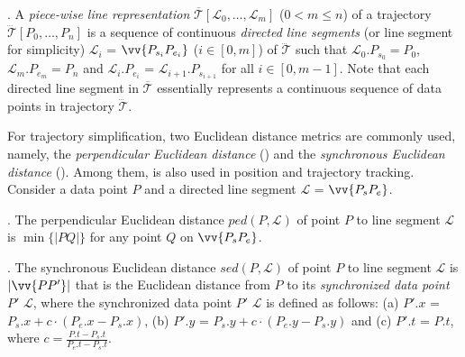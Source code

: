 
. A \textit{piece-wise line representation} $\overline{\mathcal{T}}\left[\mathcal{L}_0, \ldots, \mathcal{L}_m\right]$ ($0< m \le n$) of a trajectory $\dddot{\mathcal{T}}\left[P_0, \ldots, P_n\right]$ is a sequence of continuous \textit{directed line segments} (or line segment for simplicity) $\mathcal{L}_{i}$ = $\vv{P_{s_i}P_{e_i}}$ ($i\in\left[0,m\right]$) of $\dddot{\mathcal{T}}$ such that $\mathcal{L}_{0}.P_{s_0} = P_0$, $\mathcal{L}_{m}.P_{e_m} = P_n$ and  $\mathcal{L}_{i}.P_{e_i}$ = $\mathcal{L}_{i+1}.P_{s_{i+1}}$ for all $i\in\left[0, m-1\right]$.
Note that each directed line segment in $\overline{\mathcal{T}}$ essentially represents a continuous sequence of data points in trajectory $\dddot{\mathcal{T}}$.



For trajectory simplification, two Euclidean distance metrics are commonly used, namely, the \emph{perpendicular Euclidean distance} (\ped) and the \emph{synchronous Euclidean distance} \cite{Meratnia:Spatiotemporal} (\sed). Among them, \sed is also used in position and trajectory tracking.
%
Consider a data point $P$ and a directed line segment $\mathcal{L}$ = $\vv{P_{s}P_{e}}$.

. The perpendicular Euclidean distance $ped\left(P, \mathcal{L}\right)$ of point $P$ to line segment $\mathcal{L}$ is $\min\{|PQ|\}$ for any point $Q$ on $\vv{P_{s}P_{e}}$.

. The synchronous Euclidean distance $sed\left(P, \mathcal{L}\right)$ of point $P$ to line segment $\mathcal{L}$ is $|\vv{PP'}|$ that is the Euclidean distance from $P$ to its \textit{synchronized data point} $P'$ \wrt $\mathcal{L}$, where the synchronized data point $P'$ \wrt $\mathcal{L}$ is defined as follows:
(a) $P'.x$ = $P_s.x +  c\cdot\left(P_e.x - P_s.x\right)$,
(b) $P'.y$ = $P_s.y +  c\cdot\left(P_e.y - P_s.y\right)$ and
(c) $P'.t$ = $P.t$, where $c= \frac{P.t-P_s.t}{P_e.t-P_s.t}$.

